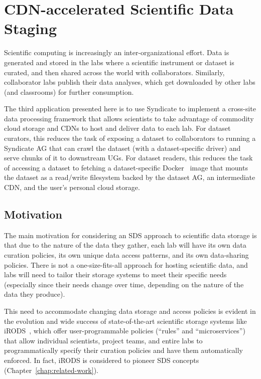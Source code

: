 \section{CDN-accelerated Scientific Data Staging}

Scientific computing is increasingly an inter-organizational effort.  Data is
generated and stored in the labs where a scientific instrument or dataset is
curated, and then shared across the world with collaborators.  Similarly,
collaborator labs publish their data analyses, which get downloaded by other labs
(and classrooms) for further consumption.

The third application presented here is to use 
Syndicate to implement a cross-site data processing framework that
allows scientists to take advantage of commodity cloud storage and CDNs to host
and deliver data to each lab.  For dataset curators, this reduces the task of
exposing a dataset to collaborators to running a Syndicate AG that can crawl the
dataset (with a dataset-specific driver) and serve chunks of it to downstream
UGs.  For dataset readers, this reduces the task of accessing a dataset to
fetching a dataset-specific Docker~\cite{docker} image that mounts the dataset
as a read/write filesystem backed by the dataset AG, an intermediate CDN, and
the user's personal cloud storage.

\subsection{Motivation}

The main motivation for considering an SDS approach to scientific data storage is
that due to the nature of the data they gather, each lab will have its own data curation
policies, its own unique data access patterns, and its own data-sharing policies.
There is not a one-size-fits-all approach for hosting scientific data, and labs will need to tailor
their storage systems to meet their specific needs (especially since their needs
change over time, depending on the nature of the data they produce).

This need to accommodate changing data storage and access policies is evident in
the evolution and wide success of state-of-the-art scientific storage systems
like iRODS~\cite{irods}, which offer
user-programmable policies (``rules'' and ``microservices'') that allow
individual scientists, project teams, and entire labs to programmatically
specify their curation policies and have them automatically enforced.
In fact, iRODS is considered to pioneer SDS concepts
(Chapter~\ref{chap:related-work}).

